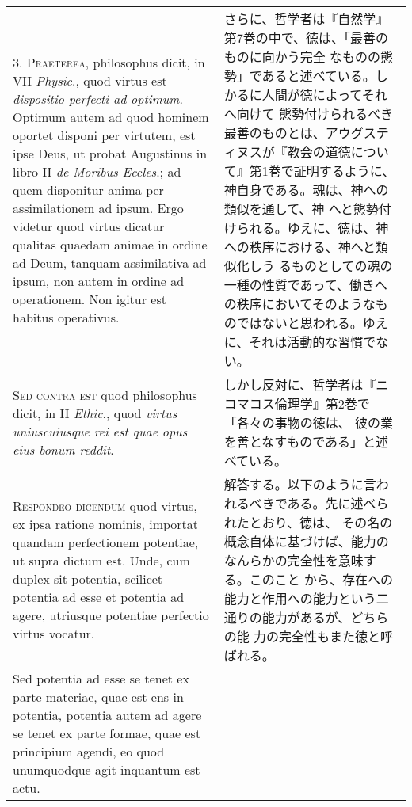 \documentclass[10pt]{jsarticle}
\begin{document}
\begin{longtable}{p{21em}p{21em}}
\\



3. {\scshape Praeterea}, philosophus dicit, in VII {\itshape Physic}.,
quod virtus est {\itshape dispositio perfecti ad optimum}. Optimum
autem ad quod hominem oportet disponi per virtutem, est ipse Deus, ut
probat Augustinus in libro II {\itshape de Moribus Eccles}.; ad quem
disponitur anima per assimilationem ad ipsum. Ergo videtur quod virtus
dicatur qualitas quaedam animae in ordine ad Deum, tanquam
assimilativa ad ipsum, non autem in ordine ad operationem. Non igitur
est habitus operativus.

&

さらに、哲学者は『自然学』第7巻の中で、徳は、「最善のものに向かう完全
なものの態勢」であると述べている。しかるに人間が徳によってそれへ向けて
態勢付けられるべき最善のものとは、アウグスティヌスが『教会の道徳につい
て』第1巻で証明するように、神自身である。魂は、神への類似を通して、神
へと態勢付けられる。ゆえに、徳は、神への秩序における、神へと類似化しう
るものとしての魂の一種の性質であって、働きへの秩序においてそのようなも
のではないと思われる。ゆえに、それは活動的な習慣でない。

\\



{\scshape Sed contra est} quod philosophus dicit, in II {\itshape
Ethic}., quod {\itshape virtus uniuscuiusque rei est quae opus eius
bonum reddit}.

&

しかし反対に、哲学者は『ニコマコス倫理学』第2巻で「各々の事物の徳は、
彼の業を善となすものである」と述べている。

\\



{\scshape Respondeo dicendum} quod virtus, ex ipsa ratione nominis,
importat quandam perfectionem potentiae, ut supra dictum est. Unde,
cum duplex sit potentia, scilicet potentia ad esse et potentia ad
agere, utriusque potentiae perfectio virtus vocatur.

&

解答する。以下のように言われるべきである。先に述べられたとおり、徳は、
その名の概念自体に基づけば、能力のなんらかの完全性を意味する。このこと
から、存在への能力と作用への能力という二通りの能力があるが、どちらの能
力の完全性もまた徳と呼ばれる。

\\

Sed potentia ad esse se tenet ex parte materiae, quae est ens in
potentia, potentia autem ad agere se tenet ex parte formae, quae est
principium agendi, eo quod unumquodque agit inquantum est actu.



\end{longtable}
\end{document}

